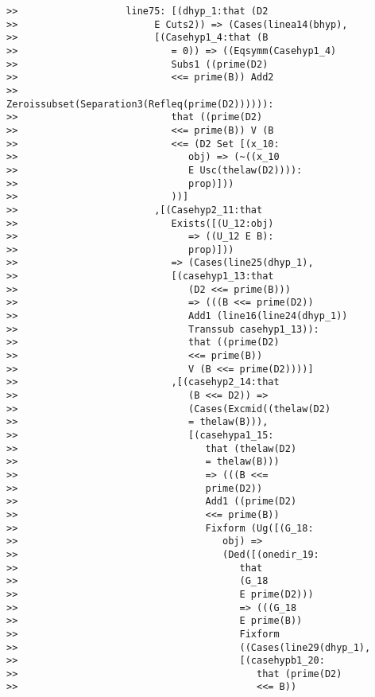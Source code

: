 \documentclass[12pt]{article}
\begin{document}
\begin{verbatim}
>>                   line75: [(dhyp_1:that (D2
>>                        E Cuts2)) => (Cases(linea14(bhyp),
>>                        [(Casehyp1_4:that (B
>>                           = 0)) => ((Eqsymm(Casehyp1_4)
>>                           Subs1 ((prime(D2)
>>                           <<= prime(B)) Add2
>>                           Zeroissubset(Separation3(Refleq(prime(D2)))))):
>>                           that ((prime(D2)
>>                           <<= prime(B)) V (B
>>                           <<= (D2 Set [(x_10:
>>                              obj) => (~((x_10
>>                              E Usc(thelaw(D2)))):
>>                              prop)]))
>>                           ))]
>>                        ,[(Casehyp2_11:that
>>                           Exists([(U_12:obj)
>>                              => ((U_12 E B):
>>                              prop)]))
>>                           => (Cases(line25(dhyp_1),
>>                           [(casehyp1_13:that
>>                              (D2 <<= prime(B)))
>>                              => (((B <<= prime(D2))
>>                              Add1 (line16(line24(dhyp_1))
>>                              Transsub casehyp1_13)):
>>                              that ((prime(D2)
>>                              <<= prime(B))
>>                              V (B <<= prime(D2))))]
>>                           ,[(casehyp2_14:that
>>                              (B <<= D2)) =>
>>                              (Cases(Excmid((thelaw(D2)
>>                              = thelaw(B))),
>>                              [(casehypa1_15:
>>                                 that (thelaw(D2)
>>                                 = thelaw(B)))
>>                                 => (((B <<=
>>                                 prime(D2))
>>                                 Add1 ((prime(D2)
>>                                 <<= prime(B))
>>                                 Fixform (Ug([(G_18:
>>                                    obj) =>
>>                                    (Ded([(onedir_19:
>>                                       that
>>                                       (G_18
>>                                       E prime(D2)))
>>                                       => (((G_18
>>                                       E prime(B))
>>                                       Fixform
>>                                       ((Cases(line29(dhyp_1),
>>                                       [(casehypb1_20:
>>                                          that (prime(D2)
>>                                          <<= B))

\end{verbatim}
\end{document}
